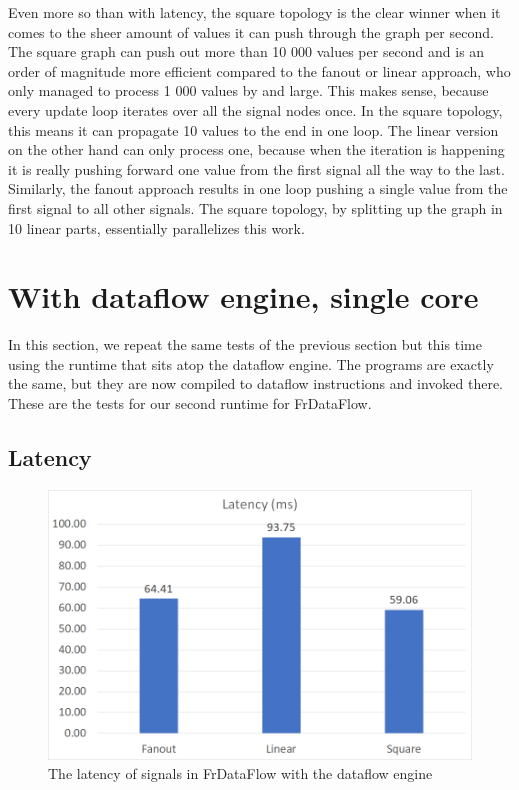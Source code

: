 Even more so than with latency, the square topology is the clear winner when it comes to the sheer amount of values it can push through the graph per second. The square graph can push out more than 10 000 values per second and is an order of magnitude more efficient compared to the fanout or linear approach, who only managed to process 1 000 values by and large. This makes sense, because every update loop iterates over all the signal nodes once. In the square topology, this means it can propagate 10 values to the end in one loop. The linear version on the other hand can only process one, because when the iteration is happening it is really pushing forward one value from the first signal all the way to the last. Similarly, the fanout approach results in one loop pushing a single value from the first signal to all other signals. The square topology, by splitting up the graph in 10 linear parts, essentially 
parallelizes this work. 

\section{With dataflow engine, single core}

In this section, we repeat the same tests of the previous section but this time using the runtime that sits atop the dataflow engine. The programs are exactly the same, but they are now compiled to dataflow instructions and invoked there. These are the tests for our second runtime for FrDataFlow. 

\subsection{Latency}

\begin{figure}[h]
    \includegraphics[width=\textwidth]{images/Evaluation-WithDataFlow-Latency.png}
	\caption{The latency of signals in FrDataFlow with the dataflow engine}
	\label{fig:evaluation-withdataflow-latency}
\end{figure}

